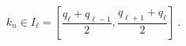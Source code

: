 \begin{equation}
k_n \in I_{\ell}=  \left[ \frac{q_{\ell}+q_{\ell-1}}{2},\frac{q_{\ell+1}+q_{\ell}}{2}\right] \ .
\label{d10}
\end{equation}

